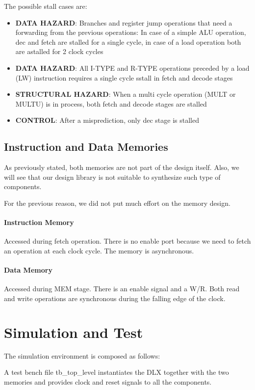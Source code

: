 \documentclass[12pt]{article}
\begin{document}
The possible stall cases are:
\begin{itemize}
	\item \textbf{DATA HAZARD}: Branches and register jump operations that need a forwarding from the previous operations: In case of a simple ALU operation, dec and fetch are stalled for a single cycle, in case of a load operation both are astalled for 2 clock cycles
	\item \textbf{DATA HAZARD}: All I-TYPE and R-TYPE operations preceded by a load (LW) instruction requires a single cycle sstall in fetch and decode stages
	\item \textbf{STRUCTURAL HAZARD}: When a multi cycle operation (MULT or MULTU) is in process, both fetch and decode stages are stalled
	\item \textbf{CONTROL}: After a misprediction, only dec stage is stalled  
\end{itemize}

\subsection{Instruction and Data Memories}

As previously stated, both memories are not part of the design itself.
Also, we will see that our design library is not suitable to synthesize such type of components.

For the previous reason, we did not put much effort on the memory design.

\paragraph{Instruction Memory} Accessed during fetch operation. There is no enable port because we need to fetch an operation at each clock cycle. The memory is asynchronous.
\paragraph{Data Memory} Accessed during MEM stage. There is an enable signal and a W/R. Both read and write operations are synchronous during the falling edge of the clock.


\section{Simulation and Test}\label{Simulation}
The simulation environment is composed as follows:

A test bench file {tb\_top\_level} instantiates the DLX together with the two memories and provides clock and reset signals to all the components.
\end{document}
